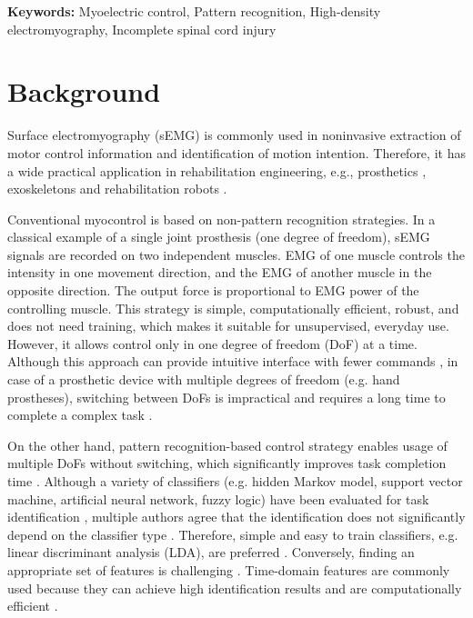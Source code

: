 \textbf{Keywords:} Myoelectric control, Pattern recognition, High-density electromyography, Incomplete spinal cord injury


\section{Background}

Surface electromyography (sEMG) is commonly used in noninvasive extraction of motor control information and identification of motion intention. Therefore, it has a wide practical application in rehabilitation engineering, e.g., prosthetics \citep{Li2010, Young2013, Stango2015}, exoskeletons \citep{VacaBenitez2013} and rehabilitation robots \citep{Dipietro2005, Marchal-Crespo2009}.

Conventional myocontrol is based on non-pattern recognition strategies. In a classical example of a single joint prosthesis (one degree of freedom), sEMG signals are recorded on two independent muscles. EMG of one muscle controls the intensity in one movement direction, and the EMG of another muscle in the opposite direction. The output force is proportional to EMG power of the controlling muscle. This strategy is simple, computationally efficient, robust, and does not need training, which makes it suitable for unsupervised, everyday use. However, it allows control only in one degree of freedom (DoF) at a time. Although this approach can provide intuitive interface with fewer commands \citep{Hakonen2015}, in case of a prosthetic device with multiple degrees of freedom (e.g. hand prostheses), switching between DoFs is impractical and requires a long time to complete a complex task \citep{Farina2014}.

On the other hand, pattern recognition-based control strategy enables usage of multiple DoFs without switching, which significantly improves task completion time \citep{Hakonen2015}. Although a variety of classifiers (e.g. hidden Markov model, support vector machine, artificial neural network, fuzzy logic) have been evaluated for task identification \citep{Oskoei2007}, multiple authors agree that the identification does not significantly depend on the classifier type \citep{Hakonen2015, Hargrove2007, Zhang2012}. Therefore, simple and easy to train classifiers, e.g. linear discriminant analysis (LDA), are preferred \citep{Scheme2013, Boschmann2013, Young2012, Li2014}. Conversely, finding an appropriate set of features is challenging \citep{Tkach2010, Liu2013, Englehart1999, Oskoei2006}. Time-domain features are commonly used because they can achieve high identification results and are computationally efficient \citep{Hakonen2015}.

